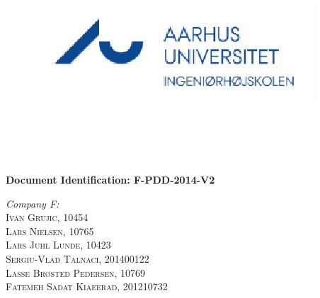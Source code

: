 \begin{titlepage}
\begin{center}



\begin{figure}
\includegraphics[scale=0.5]{./images/logo.png}\\
\\   
\\
\end{figure}
\\[0.5cm]
\\[2cm]

{ \bfseries Document Identification: F-PDD-2014-V2}\\[2cm]



\begin{flushleft} \large
\emph{Company F:}\\
\textsc{Ivan Grujic, 10454\\}
\textsc{Lars Nielsen, 10765\\}
\textsc{Lars Juhl Lunde, 10423\\}
\textsc{Sergiu-Vlad Talnaci, 201400122\\}
\textsc{Lasse Br\o sted Pedersen, 10769\\}
\textsc{Fatemeh Sadat Kiaeerad, 201210732\\}\\[2cm]
 \\ 
\\
\end{flushleft}\\




\end{center}
\end{titlepage}

